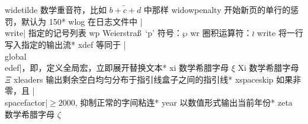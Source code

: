 \capcs widetilde {数学重音符，比如 $\widetilde {b+c+d}$ 中那样}{}{}
\capcs widowpenalty {开始新页的单行的惩罚，默认为 150}*{}
\capcs wlog {在日志文件中 |\\write| 指定的记号列表}{}{}
\capcs wp {Weierstra\ss\ `p' 符号：$\wp$}{}{}
\capcs wr {圈积运算符：$\wr$}{}{}
\capcs write {将一行写入指定的输出流}*{}
\capcs xdef {等同于 |\\global\\edef|，即，定义全局宏，立即展开替换文本}*{}
\capcs xi {数学希腊字母 $\xi$}{}{}
\capcs Xi {数学希腊字母 $\Xi$}{}{}
\capcs xleaders {输出剩余空白均匀分布于指引线盒子之间的指引线}*{}
\capcs xspaceskip {如果非零，且 |\\spacefactor|${}\ge2000$, 抑制正常的字间粘连}*{}
\capcs year {以数值形式输出当前年份}*{}
\capcs zeta {数学希腊字母 $\zeta$}{}{}

\endcapsum
\endchapter
\byebye

